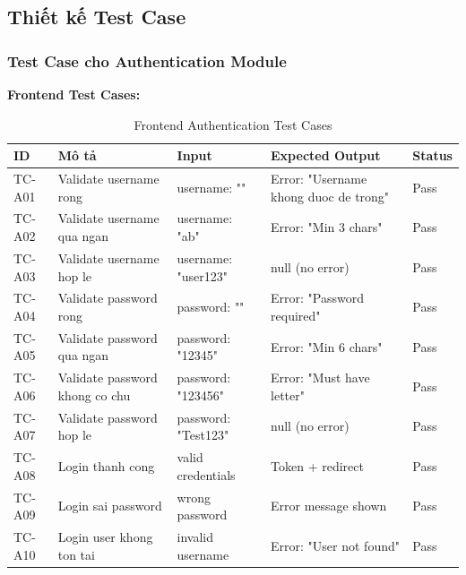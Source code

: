 \subsection{Thiết kế Test Case}

\subsubsection{Test Case cho Authentication Module}
\textbf{Frontend Test Cases:}
\begin{table}[H]
\centering
\small
\begin{tabular}{|p{1cm}|p{3.5cm}|p{3cm}|p{3.5cm}|p{1.5cm}|}
\hline
\textbf{ID} & \textbf{Mô tả} & \textbf{Input} & \textbf{Expected Output} & \textbf{Status} \\
\hline
TC-A01 & Validate username rong & username: "" & Error: "Username khong duoc de trong" & Pass \\
\hline
TC-A02 & Validate username qua ngan & username: "ab" & Error: "Min 3 chars" & Pass \\
\hline
TC-A03 & Validate username hop le & username: "user123" & null (no error) & Pass \\
\hline
TC-A04 & Validate password rong & password: "" & Error: "Password required" & Pass \\
\hline
TC-A05 & Validate password qua ngan & password: "12345" & Error: "Min 6 chars" & Pass \\
\hline
TC-A06 & Validate password khong co chu & password: "123456" & Error: "Must have letter" & Pass \\
\hline
TC-A07 & Validate password hop le & password: "Test123" & null (no error) & Pass \\
\hline
TC-A08 & Login thanh cong & valid credentials & Token + redirect & Pass \\
\hline
TC-A09 & Login sai password & wrong password & Error message shown & Pass \\
\hline
TC-A10 & Login user khong ton tai & invalid username & Error: "User not found" & Pass \\
\hline
\end{tabular}
\caption{Frontend Authentication Test Cases}
\end{table}

